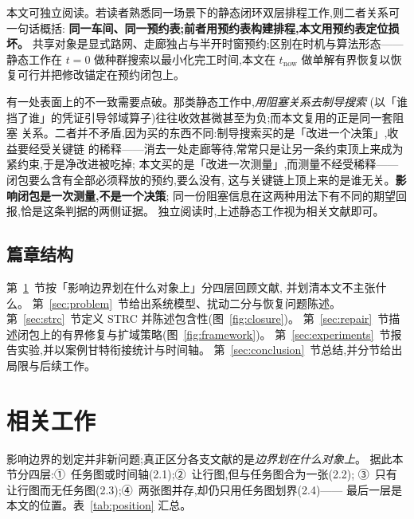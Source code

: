 \documentclass[manuscript,screen,review]{acmart}
\providecommand{\STRC}{\textsc{STRC}}
\begin{document}
本文可独立阅读。若读者熟悉同一场景下的静态闭环双层排程工作,则二者关系可一句话概括:
\textbf{同一车间、同一预约表;前者用预约表构建排程,本文用预约表定位损坏。}
共享对象是显式路网、走廊独占与半开时窗预约;区别在时机与算法形态——
静态工作在 \(t=0\) 做种群搜索以最小化完工时间,本文在 \(t_{\mathrm{now}}\)
做单解有界恢复以恢复可行并把修改锚定在预约闭包上。

有一处表面上的不一致需要点破。那类静态工作中,\emph{用阻塞关系去制导搜索}
(以「谁挡了谁」的凭证引导邻域算子)往往收效甚微甚至为负;而本文复用的正是同一套阻塞
关系。二者并不矛盾,因为买的东西不同:制导搜索买的是「改进一个决策」,收益要经受关键链
的稀释——消去一处走廊等待,常常只是让另一条约束顶上来成为紧约束,于是净改进被吃掉;
本文买的是「改进一次测量」,而测量不经受稀释——闭包要么含有全部必须释放的预约,要么没有,
这与关键链上顶上来的是谁无关。\textbf{影响闭包是一次测量,不是一个决策};
同一份阻塞信息在这两种用法下有不同的期望回报,恰是这条判据的两侧证据。
独立阅读时,上述静态工作视为相关文献即可。

\subsection{篇章结构}

第~\ref{sec:related_work}~节按「影响边界划在什么对象上」分四层回顾文献,
并划清本文不主张什么。
第~\ref{sec:problem}~节给出系统模型、扰动二分与恢复问题陈述。
第~\ref{sec:strc}~节定义 \STRC{} 并陈述包含性(图~\ref{fig:closure})。
第~\ref{sec:repair}~节描述闭包上的有界修复与扩域策略(图~\ref{fig:framework})。
第~\ref{sec:experiments}~节报告实验,并以案例甘特衔接统计与时间轴。
第~\ref{sec:conclusion}~节总结,并分节给出局限与后续工作。

\section{相关工作}
\label{sec:related_work}


影响边界的划定并非新问题;真正区分各支文献的是\emph{边界划在什么对象上}。
据此本节分四层:①~任务图或时间轴(2.1);②~让行图,但与任务图合为一张(2.2);
③~只有让行图而无任务图(2.3);④~两张图并存,却仍只用任务图划界(2.4)——
最后一层是本文的位置。表~\ref{tab:position} 汇总。
\end{document}
